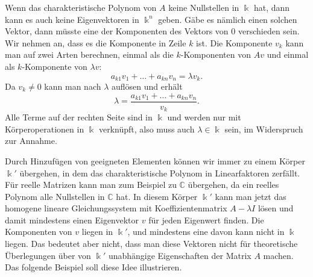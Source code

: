 Wenn das charakteristische Polynom von $A$ keine Nullstellen in $\Bbbk$ hat,
dann kann es auch keine Eigenvektoren in $\Bbbk^n$ geben.
Gäbe es nämlich einen solchen Vektor, dann müsste eine der Komponenten
des Vektors von $0$ verschieden sein.
Wir nehmen an, dass es die Komponente in Zeile $k$ ist.
Die Komponente $v_k$ kann man auf zwei Arten berechnen, einmal als
die $k$-Komponenten von $Av$ und einmal als $k$-Komponente von $\lambda v$:
\[
a_{k1}v_1+\dots+a_{kn}v_n = \lambda v_k.
\]
Da $v_k\ne 0$ kann man nach $\lambda$ auflösen und erhält
\[
\lambda = \frac{a_{k1}v_1+\dots + a_{kn}v_n}{v_k}.
\]
Alle Terme auf der rechten Seite sind in $\Bbbk$ und werden nur mit
Körperoperationen in $\Bbbk$ verknüpft, also muss auch $\lambda\in\Bbbk$
sein, im Widerspruch zur Annahme.

Durch Hinzufügen von geeigneten Elementen können wir immer zu einem 
Körper $\Bbbk'$ übergehen, in dem das charakteristische Polynom
in Linearfaktoren zerfällt.
%
Für reelle Matrizen kann man zum Beispiel zu $\mathbb{C}$ übergehen,
da ein reelles Polynom alle Nullstellen in $\mathbb{C}$ hat.
In diesem Körper $\Bbbk'$ kann man jetzt das homogene lineare Gleichungssystem
mit Koeffizientenmatrix $A-\lambda I$ lösen und damit mindestens 
einen Eigenvektor $v$ für jeden Eigenwert finden.
Die Komponenten von $v$ liegen in $\Bbbk'$, und mindestens eine davon kann
nicht in $\Bbbk$ liegen.
Das bedeutet aber nicht, dass man diese Vektoren nicht für theoretische
Überlegungen über von $\Bbbk'$ unabhängige Eigenschaften der Matrix $A$ machen.
Das folgende Beispiel soll diese Idee illustrieren.


